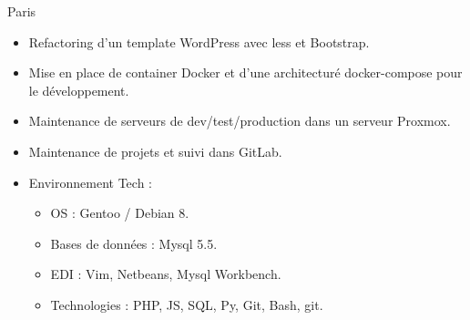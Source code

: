 \documentclass[10pt,a4paper,sans]{moderncv}
\begin{document}
{Paris}{
    \begin{itemize}%
        \item Refactoring d'un template WordPress avec less et Bootstrap.
        \item Mise en place de container Docker et d'une architecturé docker-compose pour le développement.
        \item Maintenance de serveurs de dev/test/production dans un serveur Proxmox.
        \item Maintenance de projets et suivi dans GitLab.
        \item Environnement Tech :
            \begin{itemize}%
                \item OS : Gentoo / Debian 8.
                \item Bases de données : Mysql 5.5.
                \item EDI : Vim, Netbeans, Mysql Workbench.
                \item Technologies : PHP, JS, SQL, Py, Git, Bash, git.
            \end{itemize}
\end{itemize}}
\end{document}

